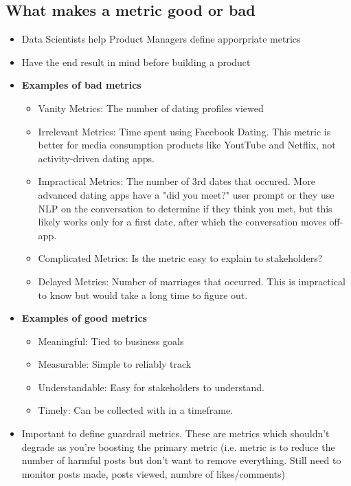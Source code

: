 \documentclass{article}
\begin{document}
\begin{multicols*}{2}
    \section{What makes a metric good or bad}
    \renewcommand\labelitemi{{\boldmath$\cdot$}}
    \begin{itemize}[noitemsep]
        \item Data Scientists help Product Managers define apporpriate
        metrics
        \item Have the end result in mind before building a product
        \item \textbf{Examples of bad metrics}
        \begin{itemize}
            \item Vanity Metrics: The number of dating profiles viewed
            \item Irrelevant Metrics: Time spent using Facebook Dating.
            This metric is better for media consumption products like 
            YoutTube and Netflix, not activity-driven dating apps.
            \item Impractical Metrics: The number of 3rd dates that occured.
            More advanced dating apps have a "did you meet?" user 
            prompt or they use NLP on the conversation to determine 
            if they think you met, but this likely works only for a
            first date, after which the conversation moves off-app.
            \item Complicated Metrics: Is the metric easy to explain to 
            stakeholders?
            \item Delayed Metrics: Number of marriages that occurred. This is 
            impractical to know but would take a long time to figure out.
        \end{itemize}
        \item \textbf{Examples of good metrics}
        \begin{itemize}
            \item Meaningful: Tied to business goals
            \item Measurable: Simple to reliably track
            \item Understandable: Easy for stakeholders to understand.
            \item Timely: Can be collected with in a timeframe.
        \end{itemize}
        \item Important to define guardrail metrics. These are metrics 
        which shouldn't degrade as you're boosting the primary metric 
        (i.e. metric is to reduce the number of harmful posts but 
        don't want to remove everything. Still need to monitor 
        posts made, posts viewed, numbre of likes/comments)
    \end{itemize}


\end{multicols*}
\end{document}
